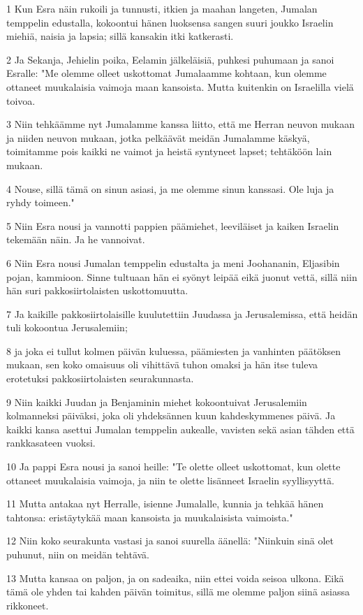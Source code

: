 \par 1 Kun Esra näin rukoili ja tunnusti, itkien ja maahan langeten, Jumalan temppelin edustalla, kokoontui hänen luoksensa sangen suuri joukko Israelin miehiä, naisia ja lapsia; sillä kansakin itki katkerasti.
\par 2 Ja Sekanja, Jehielin poika, Eelamin jälkeläisiä, puhkesi puhumaan ja sanoi Esralle: "Me olemme olleet uskottomat Jumalaamme kohtaan, kun olemme ottaneet muukalaisia vaimoja maan kansoista. Mutta kuitenkin on Israelilla vielä toivoa.
\par 3 Niin tehkäämme nyt Jumalamme kanssa liitto, että me Herran neuvon mukaan ja niiden neuvon mukaan, jotka pelkäävät meidän Jumalamme käskyä, toimitamme pois kaikki ne vaimot ja heistä syntyneet lapset; tehtäköön lain mukaan.
\par 4 Nouse, sillä tämä on sinun asiasi, ja me olemme sinun kanssasi. Ole luja ja ryhdy toimeen."
\par 5 Niin Esra nousi ja vannotti pappien päämiehet, leeviläiset ja kaiken Israelin tekemään näin. Ja he vannoivat.
\par 6 Niin Esra nousi Jumalan temppelin edustalta ja meni Joohananin, Eljasibin pojan, kammioon. Sinne tultuaan hän ei syönyt leipää eikä juonut vettä, sillä niin hän suri pakkosiirtolaisten uskottomuutta.
\par 7 Ja kaikille pakkosiirtolaisille kuulutettiin Juudassa ja Jerusalemissa, että heidän tuli kokoontua Jerusalemiin;
\par 8 ja joka ei tullut kolmen päivän kuluessa, päämiesten ja vanhinten päätöksen mukaan, sen koko omaisuus oli vihittävä tuhon omaksi ja hän itse tuleva erotetuksi pakkosiirtolaisten seurakunnasta.
\par 9 Niin kaikki Juudan ja Benjaminin miehet kokoontuivat Jerusalemiin kolmanneksi päiväksi, joka oli yhdeksännen kuun kahdeskymmenes päivä. Ja kaikki kansa asettui Jumalan temppelin aukealle, vavisten sekä asian tähden että rankkasateen vuoksi.
\par 10 Ja pappi Esra nousi ja sanoi heille: "Te olette olleet uskottomat, kun olette ottaneet muukalaisia vaimoja, ja niin te olette lisänneet Israelin syyllisyyttä.
\par 11 Mutta antakaa nyt Herralle, isienne Jumalalle, kunnia ja tehkää hänen tahtonsa: eristäytykää maan kansoista ja muukalaisista vaimoista."
\par 12 Niin koko seurakunta vastasi ja sanoi suurella äänellä: "Niinkuin sinä olet puhunut, niin on meidän tehtävä.
\par 13 Mutta kansaa on paljon, ja on sadeaika, niin ettei voida seisoa ulkona. Eikä tämä ole yhden tai kahden päivän toimitus, sillä me olemme paljon siinä asiassa rikkoneet.
